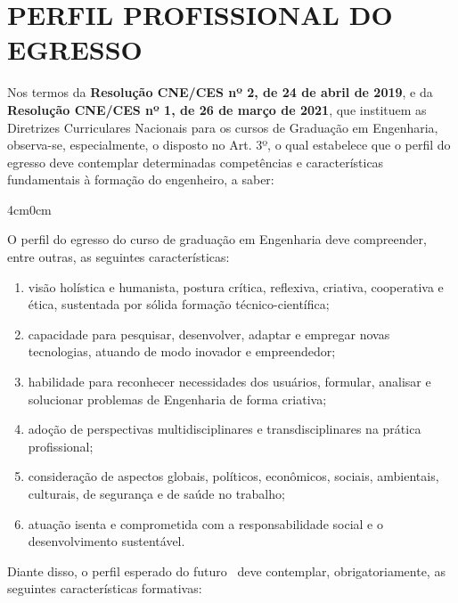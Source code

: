 \section{PERFIL PROFISSIONAL DO EGRESSO}

Nos termos da \textbf{Resolução CNE/CES nº 2, de 24 de abril de 2019}, e da \textbf{Resolução CNE/CES nº 1, de 26 de março de 2021}, que instituem as Diretrizes Curriculares Nacionais para os cursos de Graduação em Engenharia, observa-se, especialmente, o disposto no Art. 3º, o qual estabelece que o perfil do egresso deve contemplar determinadas competências e características fundamentais à formação do engenheiro, a saber:

\begin{adjustwidth}{4cm}{0cm}
\it \footnotesize {}

	O perfil do egresso do curso de graduação em Engenharia deve compreender, entre outras, as seguintes características:
	
	\begin{enumerate}[label=\Roman* -]
		\item visão holística e humanista, postura crítica, reflexiva, criativa, cooperativa e ética, sustentada por sólida formação técnico-científica;
		\item capacidade para pesquisar, desenvolver, adaptar e empregar novas tecnologias, atuando de modo inovador e empreendedor;
		\item habilidade para reconhecer necessidades dos usuários, formular, analisar e solucionar problemas de Engenharia de forma criativa;
		\item adoção de perspectivas multidisciplinares e transdisciplinares na prática profissional;
		\item consideração de aspectos globais, políticos, econômicos, sociais, ambientais, culturais, de segurança e de saúde no trabalho;
		\item atuação isenta e comprometida com a responsabilidade social e o desenvolvimento sustentável.
	\end{enumerate}
	
\end{adjustwidth}

Diante disso, o perfil esperado do futuro \NOMEPROFISSIONAL\ deve contemplar, obrigatoriamente, as seguintes características formativas:

